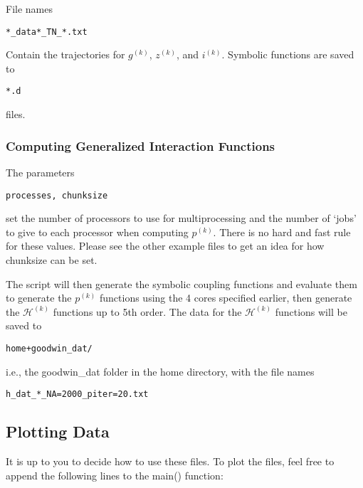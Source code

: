 \documentclass[english,a4paper,oneside]{article}
\begin{document}
File names

\begin{verbatim}
*_data*_TN_*.txt 
\end{verbatim}

Contain the trajectories for \(g^{(k)}\), \(z^{(k)}\), and \(i^{(k)}\).
Symbolic functions are saved to

\begin{verbatim}
*.d
\end{verbatim}

files.

\subsubsection{Computing Generalized Interaction
Functions}\label{computing-generalized-interaction-functions}

The parameters

\begin{verbatim}
processes, chunksize
\end{verbatim}

set the number of processors to use for multiprocessing and the number
of `jobs' to give to each processor when computing \(p^{(k)}\). There is
no hard and fast rule for these values. Please see the other example
files to get an idea for how chunksize can be set.

The script will then generate the symbolic coupling functions and
evaluate them to generate the \(p^{(k)}\) functions using the 4 cores
specified earlier, then generate the \(\mathcal{H}^{(k)}\) functions up
to 5th order. The data for the \(\mathcal{H}^{(k)}\) functions will be
saved to

\begin{verbatim}
home+goodwin_dat/
\end{verbatim}

i.e., the goodwin\_dat folder in the home directory, with the file names

\begin{verbatim}
h_dat_*_NA=2000_piter=20.txt
\end{verbatim}

\subsection{Plotting Data}\label{plotting-data}

It is up to you to decide how to use these files. To plot the files,
feel free to append the following lines to the main() function:
\end{document}
